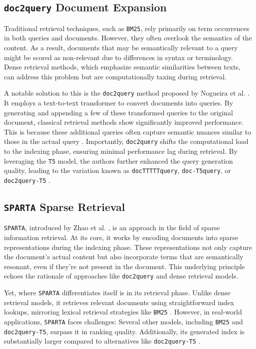 \documentclass[sigconf]{acmart}
\begin{document}
\subsection{\texttt{doc2query} Document Expansion}\label{sec:doc2query}
Traditional retrieval techniques, such as \texttt{BM25}, rely primarily on term occurrences in both queries and documents. However, they often overlook the semantics of the content. As a result, documents that may be semantically relevant to a query might be scored as non-relevant due to differences in syntax or terminology. Dense retrieval methods, which emphasize semantic similarities between texts, can address this problem but are computationally taxing during retrieval.

A notable solution to this is the \texttt{doc\-2query} method proposed by Nogueira et al. \cite{nogueira2019document}. It employs a text-to-text transformer to convert documents into queries. By generating and appending a few of these transformed queries to the original document, classical retrieval methods show significantly improved performance. This is because these additional queries often capture semantic nuances similar to those in the actual query \cite{nogueira2019document,nogueira2019doc2query,pradeep2021expando}. Importantly, \texttt{doc\-2query} shifts the computational load to the indexing phase, ensuring minimal performance lag during retrieval. By leveraging the \texttt{T5} model, the authors further enhanced the query generation quality, leading to the variation known as \texttt{doc\-TTTTTquery}, \texttt{doc\--T5query}, or \texttt{doc\-2query\--T5} \cite{nogueira2019doc2query}.

\subsection{\texttt{SPARTA} Sparse Retrieval}\label{sec:sparta}
\texttt{SPARTA}, introduced by Zhao et al. \cite{zhao2020sparta}, is an approach in the field of sparse information retrieval. At its core, it works by encoding documents into sparse representations during the indexing phase. These representations not only capture the document's actual content but also incorporate terms that are semantically resonant, even if they're not present in the document. This underlying principle echoes the rationale of approaches like \texttt{doc2query} and dense retrieval models.

Yet, where \texttt{SPARTA} differentiates itself is in its retrieval phase. Unlike dense retrieval models, it retrieves relevant documents using straightforward index lookups, mirroring lexical retrieval strategies like \texttt{BM25} \cite{zhao2020sparta}. However, in real-world applications, \texttt{SPARTA} faces challenges: Several other models, including \texttt{BM25} and \texttt{doc2query-T5}, surpass it in ranking quality. Additionally, its generated index is substantially larger compared to alternatives like \texttt{doc2query-T5} \cite{thakur2021beir}.
\end{document}

